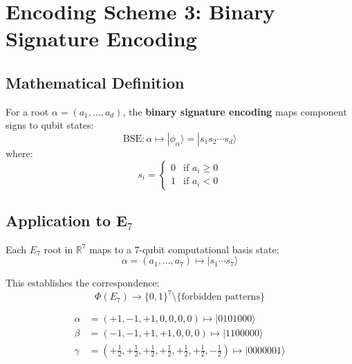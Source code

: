 \section{Encoding Scheme 3: Binary Signature Encoding}

\subsection{Mathematical Definition}

\begin{definition}
\label{def:binary_encoding}
For a root $\alpha = (a_1, \ldots, a_d)$, the \textbf{binary signature encoding} maps component signs to qubit states:
\begin{equation}
\text{BSE}: \alpha \mapsto |\phi_\alpha\rangle = |s_1 s_2 \cdots s_d\rangle
\end{equation}
where:
\begin{equation}
s_i = \begin{cases}
0 & \text{if } a_i \ge 0 \\
1 & \text{if } a_i < 0
\end{cases}
\end{equation}
\end{definition}

\subsection{Application to E$_7$}

\begin{theorem}
\label{thm:e7_binary_encoding}
Each $E_7$ root in $\mathbb{R}^7$ maps to a 7-qubit computational basis state:
\begin{equation}
\alpha = (a_1, \ldots, a_7) \mapsto |s_1 \cdots s_7\rangle
\end{equation}

This establishes the correspondence:
\begin{equation}
\Phi(E_7) \to \{0,1\}^7 \setminus \{\text{forbidden patterns}\}
\end{equation}
\end{theorem}

\begin{example}
\begin{align}
\alpha &= (+1, -1, +1, 0, 0, 0, 0) \mapsto |0101000\rangle \\
\beta &= (-1, -1, +1, +1, 0, 0, 0) \mapsto |1100000\rangle \\
\gamma &= (+\frac{1}{2}, +\frac{1}{2}, +\frac{1}{2}, +\frac{1}{2}, +\frac{1}{2}, +\frac{1}{2}, -\frac{1}{2}) \mapsto |0000001\rangle
\end{align}
\end{example}

